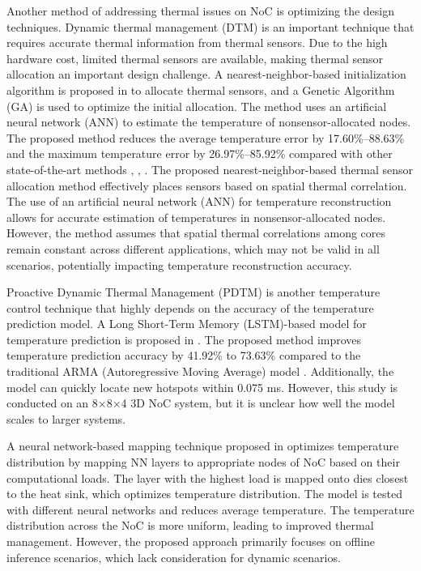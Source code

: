 \documentclass[conference]{IEEEtran}
\begin{document}
Another method of addressing thermal issues on NoC is optimizing the design techniques. Dynamic thermal management (DTM) \cite{DTM_ref} is an important technique that requires accurate thermal information from thermal sensors. Due to the high hardware cost, limited thermal sensors are available, making thermal sensor allocation an important design challenge. A nearest-neighbor-based initialization algorithm is proposed in \cite{NN_ref} to allocate thermal sensors, and a Genetic Algorithm (GA) is used to optimize the initial allocation. The method uses an artificial neural network (ANN) to estimate the temperature of nonsensor-allocated nodes.
The proposed method reduces the average temperature error by 17.60\%–88.63\% and the maximum temperature error by 26.97\%–85.92\% compared with other state-of-the-art methods \cite{method7}, \cite{method8}, \cite{method9}. The proposed nearest-neighbor-based thermal sensor allocation method effectively places sensors based on spatial thermal correlation. The use of an artificial neural network (ANN) for temperature reconstruction allows for accurate estimation of temperatures in nonsensor-allocated nodes. However, the method assumes that spatial thermal correlations among cores remain constant across different applications, which may not be valid in all scenarios, potentially impacting temperature reconstruction accuracy.

Proactive Dynamic Thermal Management (PDTM) \cite{pdtm} is another temperature control technique that highly depends on the accuracy of the temperature prediction model. A Long Short-Term Memory (LSTM)-based model for temperature prediction is proposed in \cite{lstm_model}. The proposed method improves temperature prediction accuracy by 41.92\% to 73.63\% compared to the traditional ARMA (Autoregressive Moving Average) model \cite{arma_model}. Additionally, the model can quickly locate new hotspots within 0.075 ms. However, this study is conducted on an 8×8×4 3D NoC system, but it is unclear how well the model scales to larger systems.

A neural network-based mapping technique proposed in \cite{nn_mapping} optimizes temperature distribution by mapping NN layers to appropriate nodes of NoC based on their computational loads. The layer with the highest load is mapped onto dies closest to the heat sink, which optimizes temperature distribution. The model is tested with different neural networks and reduces average temperature. The temperature distribution across the NoC is more uniform, leading to improved thermal management. However, the proposed approach primarily focuses on offline inference scenarios, which lack consideration for dynamic scenarios.
\end{document}
